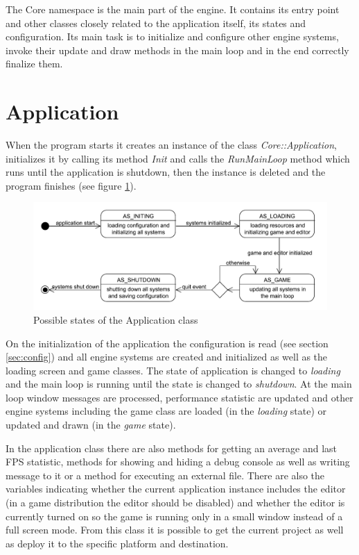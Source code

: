 \documentclass[a4paper, 12pt]{report}
\begin{document}
The Core namespace is the main part of the engine. It contains its entry point and other classes closely related to the application itself, its states and configuration. Its main task is to initialize and configure other engine systems, invoke their update and draw methods in the main loop and in the end correctly finalize them.

\section{Application}

When the program starts it creates an instance of the class \emph{Core::Application}, initializes it by calling its method \emph{Init} and calls the \emph{RunMainLoop} method which runs until the application is shutdown, then the instance is deleted and the program finishes (see figure \ref{fig:application-states}).

\begin{figure}[htbp]
	\centering
		\includegraphics[width=1\textwidth]{ApplicationStates.pdf}
	\caption{Possible states of the Application class}
	\label{fig:application-states}
\end{figure}

On the initialization of the application the configuration is read (see section \ref{sec:config}) and all engine systems are created and initialized as well as the loading screen and game classes. The state of application is changed to \emph{loading} and the main loop is running until the state is changed to \emph{shutdown}. At the main loop window messages are processed, performance statistic are updated and other engine systems including the game class are loaded (in the \emph{loading} state) or updated and drawn (in the \emph{game} state).

In the application class there are also methods for getting an average and last FPS statistic, methods for showing and hiding a debug console as well as writing message to it or a method for executing an external file. There are also the variables indicating whether the current application instance includes the editor (in a game distribution the editor should be disabled) and whether the editor is currently turned on so the game is running only in a small window instead of a full screen mode. From this class it is possible to get the current project as well as deploy it to the specific platform and destination.
\end{document}
